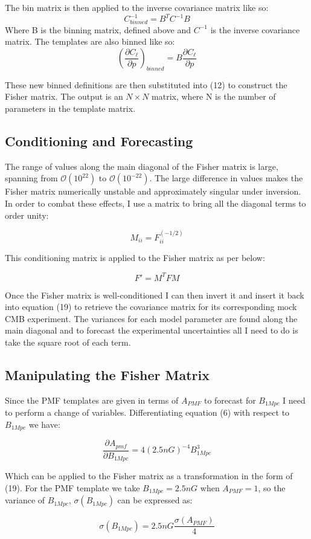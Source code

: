 The bin matrix is then applied to the inverse covariance matrix like so:
\begin{equation}
C^{-1}_{binned} = B^{T} C^{-1} B
\end{equation}
Where B is the binning matrix, defined above and $C^{-1}$ is the inverse covariance matrix. The templates are also binned like so:
\begin{equation}
(\frac{\partial C_{\ell}}{\partial p})_{binned} = B\frac{\partial C_{\ell}}{\partial p}
\end{equation}
 
These new binned definitions are then substituted into (12) to construct the Fisher matrix. The output is an $N \times N$ matrix, where N is the number of parameters in the template matrix.

\subsection{Conditioning and Forecasting}

The range of values along the main diagonal of the Fisher matrix is large, spanning from $\mathcal{O} (10^{22})$ to $\mathcal{O} (10^{-22})$. The large difference in values makes the Fisher matrix numerically unstable and approximately singular under inversion. In order to combat these effects, I use a matrix to bring all the diagonal terms to order unity:

\begin{equation}
M_{ii} = F^{(-1/2)}_{ii}
\end{equation}
 
This conditioning matrix is applied to the Fisher matrix as per below:

\begin{equation}
F' = M^{T} F M
\end{equation}
 
Once the Fisher matrix is well-conditioned I can then invert it and insert it back into equation (19) to retrieve the covariance matrix for its corresponding mock CMB experiment. The variances for each model parameter are found along the main diagonal and to forecast the experimental uncertainties all I need to do is take the square root of each term.

\subsection{Manipulating the Fisher Matrix}

Since the PMF templates are given in terms of $A_{PMF}$ to forecast for $B_{1Mpc}$ I need to perform a change of variables. Differentiating equation (6) with respect to $B_{1Mpc}$ we have:

$$
\frac{\partial A_{pmf}}{\partial B_{1Mpc}} = 4(2.5nG)^{-4}B_{1Mpc}^3
$$
 
Which can be applied to the Fisher matrix as a transformation in the form of (19).
For the PMF template we take $B_{1Mpc} = 2.5nG$ when $A_{PMF} = 1$, so
the variance of $B_{1Mpc}$, $\sigma(B_{1Mpc})$ can be expressed as:

\begin{equation}
\sigma(B_{1Mpc}) = 2.5nG\frac{\sigma(A_{PMF})}{4}
\end{equation}

